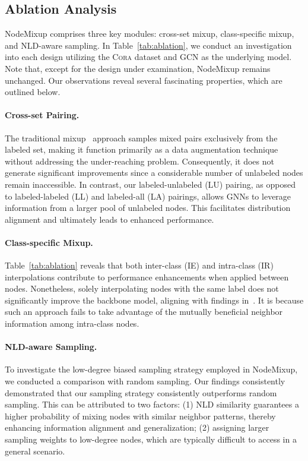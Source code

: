 \documentclass[letterpaper]{article} %
\begin{document}
\subsection{Ablation Analysis}
\label{sec:abla}
NodeMixup comprises three key modules: cross-set mixup, class-specific mixup, and NLD-aware sampling. In Table~\ref{tab:ablation}, we conduct an investigation into each design utilizing the \textsc{Cora} dataset and GCN as the underlying model. Note that, except for the design under examination, NodeMixup remains unchanged. Our observations reveal several fascinating properties, which are outlined below.

 \paragraph{Cross-set Pairing.} The traditional mixup~\cite{mixup} approach samples mixed pairs exclusively from the labeled set, making it function primarily as a data augmentation technique without addressing the under-reaching problem. Consequently, it does not generate significant improvements since a considerable number of unlabeled nodes remain inaccessible. In contrast, our labeled-unlabeled (LU) pairing, as opposed to labeled-labeled (LL) and labeled-all (LA) pairings, allows GNNs to leverage information from a larger pool of unlabeled nodes. This facilitates distribution alignment and ultimately leads to enhanced performance.
   
 \paragraph{Class-specific Mixup.} Table~\ref{tab:ablation} reveals that both inter-class (IE) and intra-class (IR) interpolations contribute to performance enhancements when applied between nodes. Nonetheless, solely interpolating nodes with the same label does not significantly improve the backbone model, aligning with findings in~\cite{mixup}. It is because such an approach fails to take advantage of the mutually beneficial neighbor information among intra-class nodes.
 
 \paragraph{NLD-aware Sampling.} To investigate the low-degree biased sampling strategy employed in NodeMixup, we conducted a comparison with random sampling. Our findings consistently demonstrated that our sampling strategy consistently outperforms random sampling. This can be attributed to two factors: (1) NLD similarity guarantees a higher probability of mixing nodes with similar neighbor patterns, thereby enhancing information alignment and generalization; (2) assigning larger sampling weights to low-degree nodes, which are typically difficult to access in a general scenario.
   
\end{document}
